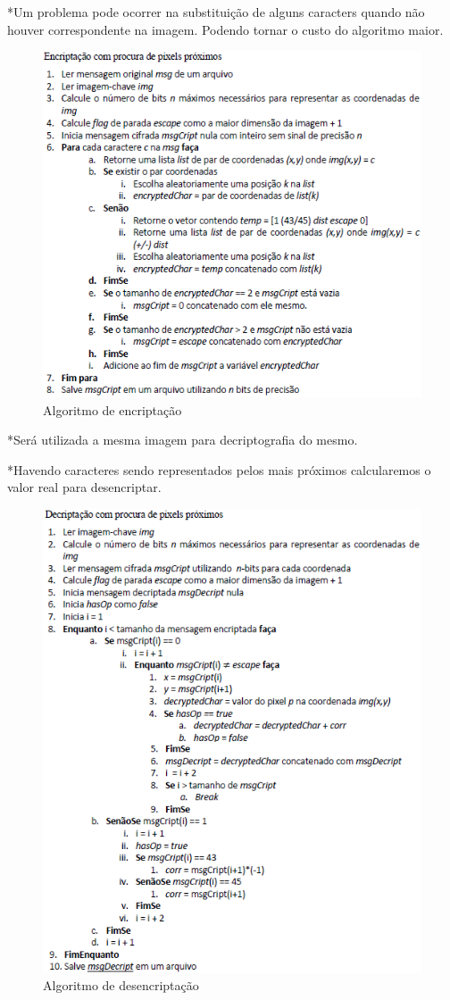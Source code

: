 \documentclass[12pt]{article}
\begin{document}
*Um problema pode ocorrer na substituição de alguns caracters quando não houver correspondente na imagem. Podendo tornar o custo do algoritmo maior.
\begin{figure}[ht]
\centering
\includegraphics[width=.9\textwidth]{images/process_encrypt.png}
\caption{Algoritmo de encriptação  \cite{mikhail:2010}}
\label{fig:encFig}
\end{figure}

*Será utilizada a mesma imagem para decriptografia do mesmo.

*Havendo caracteres sendo representados pelos mais próximos calcularemos o valor real para desencriptar.

\begin{figure}[ht]
\centering
\includegraphics[width=.9\textwidth]{images/process_decrypt.png}
\caption{Algoritmo de desencriptação \cite{mikhail:2010}}
\label{fig:decFig}
\end{figure}
\end{document}
